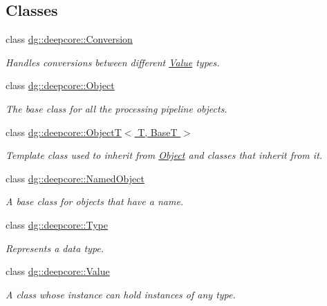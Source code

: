 \subsection*{Classes}
\begin{DoxyCompactItemize}
\item 
class \hyperlink{classdg_1_1deepcore_1_1_conversion}{dg\+::deepcore\+::\+Conversion}
\begin{DoxyCompactList}\small\item\em Handles conversions between different \hyperlink{classdg_1_1deepcore_1_1_value}{Value} types. \end{DoxyCompactList}\item 
class \hyperlink{classdg_1_1deepcore_1_1_object}{dg\+::deepcore\+::\+Object}
\begin{DoxyCompactList}\small\item\em The base class for all the processing pipeline objects. \end{DoxyCompactList}\item 
class \hyperlink{classdg_1_1deepcore_1_1_object_t}{dg\+::deepcore\+::\+Object\+T$<$ T, Base\+T $>$}
\begin{DoxyCompactList}\small\item\em Template class used to inherit from \hyperlink{classdg_1_1deepcore_1_1_object}{Object} and classes that inherit from it. \end{DoxyCompactList}\item 
class \hyperlink{classdg_1_1deepcore_1_1_named_object}{dg\+::deepcore\+::\+Named\+Object}
\begin{DoxyCompactList}\small\item\em A base class for objects that have a name. \end{DoxyCompactList}\item 
class \hyperlink{classdg_1_1deepcore_1_1_type}{dg\+::deepcore\+::\+Type}
\begin{DoxyCompactList}\small\item\em Represents a data type. \end{DoxyCompactList}\item 
class \hyperlink{classdg_1_1deepcore_1_1_value}{dg\+::deepcore\+::\+Value}
\begin{DoxyCompactList}\small\item\em A class whose instance can hold instances of any type. \end{DoxyCompactList}\end{DoxyCompactItemize}
